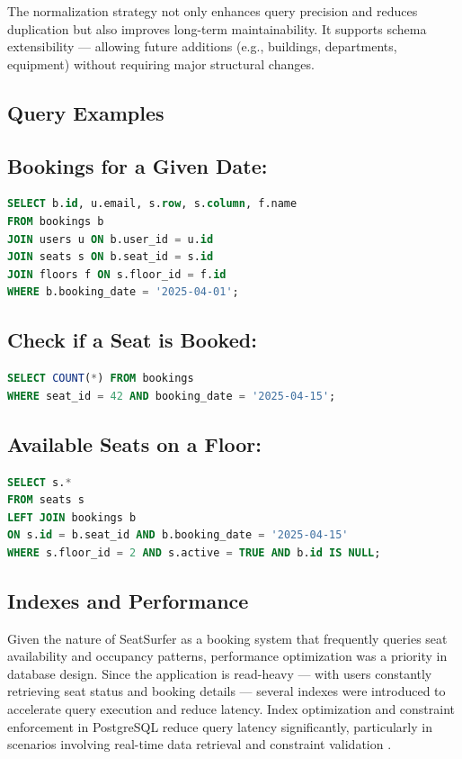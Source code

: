 \documentclass[12pt,a4paper]{report} %
\begin{document}
The normalization strategy not only enhances query precision and reduces duplication but also improves long-term maintainability. It supports schema extensibility — allowing future additions (e.g., buildings, departments, equipment) without requiring major structural changes.

\subsection{Query Examples}

\subsection*{Bookings for a Given Date:}

\begin{lstlisting}[language=SQL]
SELECT b.id, u.email, s.row, s.column, f.name
FROM bookings b
JOIN users u ON b.user_id = u.id
JOIN seats s ON b.seat_id = s.id
JOIN floors f ON s.floor_id = f.id
WHERE b.booking_date = '2025-04-01';
\end{lstlisting}

\subsection*{Check if a Seat is Booked:}

\begin{lstlisting}[language=SQL]
SELECT COUNT(*) FROM bookings
WHERE seat_id = 42 AND booking_date = '2025-04-15';
\end{lstlisting}

\subsection*{Available Seats on a Floor:}

\begin{lstlisting}[language=SQL]
SELECT s.*
FROM seats s
LEFT JOIN bookings b
ON s.id = b.seat_id AND b.booking_date = '2025-04-15'
WHERE s.floor_id = 2 AND s.active = TRUE AND b.id IS NULL;
\end{lstlisting}

\subsection{Indexes and Performance}

Given the nature of SeatSurfer as a booking system that frequently queries seat availability and occupancy patterns, performance optimization was a priority in database design. Since the application is read-heavy — with users constantly retrieving seat status and booking details — several indexes were introduced to accelerate query execution and reduce latency. Index optimization and constraint enforcement in PostgreSQL reduce query latency significantly, particularly in scenarios involving real-time data retrieval and constraint validation \cite{lee2022postgisi}.
\end{document}
